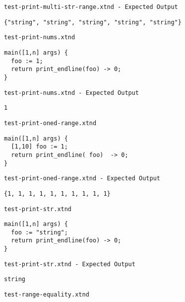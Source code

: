 \medskip \noindent \texttt{test-print-multi-str-range.xtnd - Expected Output}


\begin{lstlisting}
{"string", "string", "string", "string", "string"}
\end{lstlisting}


\medskip \noindent \texttt{test-print-nums.xtnd}


\begin{lstlisting}
main([1,n] args) {
  foo := 1;
  return print_endline(foo) -> 0;
}
\end{lstlisting}


\medskip \noindent \texttt{test-print-nums.xtnd - Expected Output}


\begin{lstlisting}
1
\end{lstlisting}


\medskip \noindent \texttt{test-print-oned-range.xtnd}


\begin{lstlisting}
main([1,n] args) {
  [1,10] foo := 1;
  return print_endline( foo)  -> 0;
}
\end{lstlisting}


\medskip \noindent \texttt{test-print-oned-range.xtnd - Expected Output}


\begin{lstlisting}
{1, 1, 1, 1, 1, 1, 1, 1, 1, 1}
\end{lstlisting}


\medskip \noindent \texttt{test-print-str.xtnd}


\begin{lstlisting}
main([1,n] args) {
  foo := "string";
  return print_endline(foo) -> 0;
}
\end{lstlisting}


\medskip \noindent \texttt{test-print-str.xtnd - Expected Output}


\begin{lstlisting}
string
\end{lstlisting}


\medskip \noindent \texttt{test-range-equality.xtnd}


